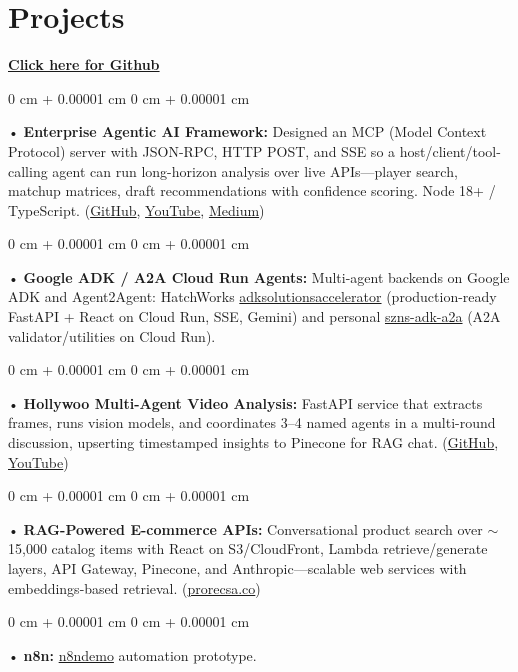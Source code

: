 \documentclass[10pt, letterpaper]{article}
\newenvironment{onecolentry}{
    \begin{adjustwidth}{
        0 cm + 0.00001 cm
    }{
        0 cm + 0.00001 cm
    }
}{
    \end{adjustwidth}
} %
\begin{document}
\section{Projects}
    \vspace{2 pt}
\textbf{\href{https://github.com/daedalus-s}{Click here for Github}}
\begin{onecolentry}
     • \textbf{Enterprise Agentic AI Framework:} Designed an MCP (Model Context Protocol) server with JSON-RPC, HTTP POST, and SSE so a host/client/tool-calling agent can run long-horizon analysis over live APIs---player search, matchup matrices, draft recommendations with confidence scoring. Node 18+ / TypeScript. (\href{https://github.com/daedalus-s/dota2-mcp-server}{GitHub}, \href{https://www.youtube.com/watch?v=op2gTYyFb5U}{YouTube}, \href{https://medium.com/@sreenikethaathreya/get-good-at-using-ai-noob-5d2576203112}{Medium})
\end{onecolentry}
\begin{onecolentry}
     • \textbf{Google ADK / A2A Cloud Run Agents:} Multi-agent backends on Google ADK and Agent2Agent: HatchWorks \href{https://github.com/sreenikethaathreya-hw/adksolutionsaccelerator}{adksolutionsaccelerator} (production-ready FastAPI + React on Cloud Run, SSE, Gemini) and personal \href{https://github.com/daedalus-s/szns-adk-a2a}{szns-adk-a2a} (A2A validator/utilities on Cloud Run).
\end{onecolentry}
\begin{onecolentry}
     • \textbf{Hollywoo Multi-Agent Video Analysis:} FastAPI service that extracts frames, runs vision models, and coordinates 3--4 named agents in a multi-round discussion, upserting timestamped insights to Pinecone for RAG chat. (\href{https://github.com/daedalus-s/fireworks-video-discussion}{GitHub}, \href{https://www.youtube.com/watch?v=KBs_3V0OAgU}{YouTube})
\end{onecolentry}
\begin{onecolentry}
     • \textbf{RAG-Powered E-commerce APIs:} Conversational product search over $\sim$15,000 catalog items with React on S3/CloudFront, Lambda retrieve/generate layers, API Gateway, Pinecone, and Anthropic---scalable web services with embeddings-based retrieval. (\href{https://prorecsa.co}{prorecsa.co})
\end{onecolentry}
\begin{onecolentry}
     • \textbf{n8n:} \href{https://github.com/sreenikethaathreya-hw/n8ndemo}{n8ndemo} automation prototype.
\end{onecolentry}
\vspace{2 pt}
\end{document}
